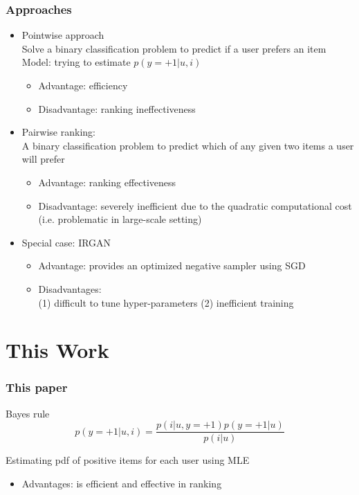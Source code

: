 \documentclass{beamer}
\begin{document}
\begin{frame} 
\frametitle{Approaches} \vspace{-7mm}
\begin{block}{}
\begin{itemize}

\item Pointwise approach \\
{\footnotesize Solve a binary classification problem to predict if a user prefers an item \\
Model: trying to estimate $p(y=+1|u,i)$} 
\begin{itemize} \pause
\item {\color{blue} Advantage}: efficiency
\item {\color{red} Disadvantage}: ranking ineffectiveness 
\end{itemize} \pause \vspace{1mm} 

\item Pairwise ranking: \\
{\footnotesize A binary classification problem to predict which of any given two items a user will prefer}
\begin{itemize} \pause
\item {\color{blue} Advantage}: ranking effectiveness 
\item {\color{red} Disadvantage}: severely inefficient due to the quadratic computational cost (i.e. problematic in large-scale setting)
\end{itemize} \vspace{1mm} \pause

\item Special case: IRGAN 
\begin{itemize}
\item {\color{blue} Advantage}: provides an optimized negative sampler using SGD
\item {\color{red} Disadvantages}: \\
(1) difficult to tune hyper-parameters (2) inefficient training
\end{itemize} 
\end{itemize}
\end{block} 
\end{frame}

\section{This Work}

\begin{frame}
\frametitle{This paper} 
\begin{block}{Bayes rule}
$$p(y=+1|u,i) = \frac{p(i|u, y=+1) p(y=+1|u)}{p(i|u)}$$ \pause
\end{block}
\begin{block}{Estimating pdf of positive items for each user using MLE}
\begin{itemize}
\item {\color{blue} Advantages}: is efficient and effective in ranking
\end{itemize} 
\end{block} 
\end{frame}
\end{document}
